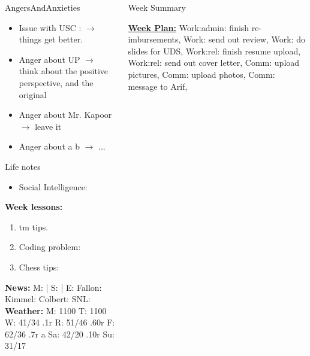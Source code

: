 \begin{columns}
\begin{column}{0.10\linewidth}
\begin{block}{AngersAndAnxieties}
      \begin{itemize}
        \item \tiny Issue with USC : $\rightarrow$ things get better. 
        \tiny \item \tiny Anger about UP $\rightarrow$ think about the positive
        perspective, and the original
      \item \tiny Anger about Mr. Kapoor $\rightarrow$  leave it
      \item \tiny Anger about a b  $\rightarrow$ ...
      \end{itemize}
    \end{block}
      \begin{block}{Life notes}
        \begin{itemize}
          \tiny \item \tiny Social Intelligence: 
        \end{itemize}
      \end{block}
      \begin{block}
        {\tiny {\bf Week lessons:}}
        \begin{enumerate}
        \item \tiny tm tips.
        \item \tiny Coding problem: 
        \item \tiny Chess tips: 
        \end{enumerate}
            {{\tiny {\tiny \bf  News:}} {\tiny  M:  | S: 
                | E: Fallon:  Kimmel:  Colbert: SNL:}}
            {{\tiny {\tiny \bf  Weather:}} {\tiny M: 1100 T: 1100 W: 41/34 .1r 
                 R: 51/46 .60r F: 62/36 .7r a Sa: 42/20 .10r Su: 31/17 }} 

      \end{block}
  \end{column}
  \begin{column}{0.6\linewidth}
    \begin{block}{Week Summary} 

      {\underline {\bf Week Plan:}  Work:admin: finish re-imbursements,
        Work: send out review, Work: do slides for UDS, Work:rel:
        finish resume upload, Work:rel: send out cover letter, Comm: upload pictures, Comm: upload
        photos, Comm: message to Arif, }\\ 


\end{block}
\end{column}
\end{columns}
